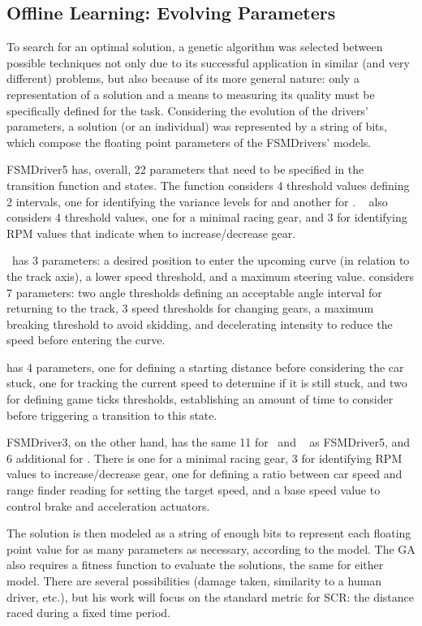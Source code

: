 \subsection{Offline Learning: Evolving Parameters}%
To search for an optimal solution, a genetic algorithm was selected between possible techniques not only due to its successful application in similar (and very different) problems, but also because of its more general nature: only a representation of a solution and a means to measuring its quality must be specifically defined for the task. Considering the evolution of the drivers' parameters, a solution (or an individual) was represented by a string of bits, which compose the floating point parameters of the FSMDrivers' models.

FSMDriver5 has, overall, 22 parameters that need to be specified in the transition function and states. The function considers 4 threshold values defining 2 intervals, one for identifying the variance levels for \SL and another for \AC. \SL~ also considers 4 threshold values, one for a minimal racing gear, and 3 for identifying RPM values that indicate when to increase/decrease gear.

\AC~has 3 parameters: a desired position to enter the upcoming curve (in relation to the track axis), a lower speed threshold, and a maximum steering value. \OT considers 7 parameters: two angle thresholds defining an acceptable angle interval for returning to the track, 3 speed thresholds for changing gears, a maximum breaking threshold to avoid skidding, and decelerating intensity to reduce the speed before entering the curve.

\St has 4 parameters, one for defining a starting distance before considering the car stuck, one for tracking the current speed to determine if it is still stuck, and two for defining game ticks thresholds, establishing an amount of time to consider before triggering a transition to this state.

FSMDriver3, on the other hand, has the same 11 for \OT~and \St~ as FSMDriver5, and 6 additional for \IT. There is one for a minimal racing gear, 3 for identifying RPM values to increase/decrease gear, one for defining a ratio between car speed and range finder reading for setting the target speed, and a base speed value to control brake and acceleration actuators.

The solution is then modeled as a string of enough bits to represent each floating point value for as many parameters as necessary, according to the model. The GA also requires a fitness function to evaluate the solutions, the same for either model. There are several possibilities (damage taken, similarity to a human driver, etc.), but his work will focus on the standard metric for SCR: the distance raced during a fixed time period.



